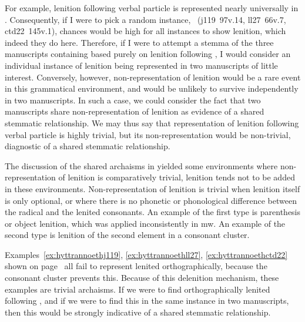 For example, lenition following verbal particle  is represented nearly universally in . Consequently, if I were to pick a random instance, \eg {}~(\gls{j119}~97v.14, \gls{ll27}~66v.7, \gls{ctd22}~145v.1), chances would be high for all instances to show lenition, which indeed they do here. Therefore, if I were to attempt a stemma of the three manuscripts containing  based purely on lenition following , I would consider an individual instance of lenition being represented in two manuscripts of little interest. Conversely, however, non-representation of lenition would be a rare event in this grammatical environment, and would be unlikely to survive independently in two manuscripts. In such a case, we could consider the fact that two manuscripts share non-representation of lenition as evidence of a shared stemmatic relationship. We may thus say that representation of lenition following verbal particle  is highly trivial, but its non-representation would be non-trivial, \ie diagnostic of a shared stemmatic relationship.

The discussion of the shared archaisms in  yielded some environments where non-representation of lenition is comparatively trivial, \ie lenition tends not to be added in these environments. Non-representation of lenition is trivial when lenition itself is only optional, or where there is no phonetic or phonological difference between the radical and the lenited consonants. An example of the first type is parenthesis or object lenition, which was applied inconsistently in \gls{mw}. An example of the second type is lenition of the second element in a  consonant cluster.

Examples~\ref{ex:hyttrannoethj119}, \ref{ex:hyttrannoethll27}, \ref{ex:hyttrannoethctd22} shown on page~ all fail to represent lenited  orthographically, because the  consonant cluster prevents this. Because of this delenition mechanism, these examples are trivial archaisms. If we were to find orthographically lenited  following , and if we were to find this in the same instance in two manuscripts, then this would be strongly indicative of a shared stemmatic relationship.


